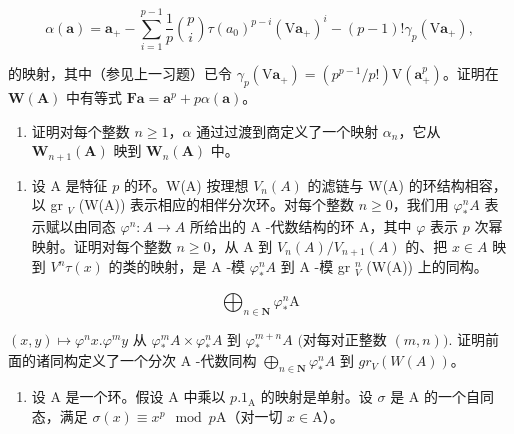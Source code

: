 \[
\alpha (\boldsymbol {a}) = \boldsymbol {a} _ {+} - \sum_ {i = 1} ^ {p - 1} \frac {1}{p} \binom {p} {i} \tau (a _ {0}) ^ {p - i} (\mathrm{V} \boldsymbol {a} _ {+}) ^ {i} - (p - 1)! \gamma_ {p} (\mathrm{V} \boldsymbol {a} _ {+}),
\]

的映射，其中（参见上一习题）已令 \(\gamma_{p}(\mathrm{V}\boldsymbol{a}_{+}) = (p^{p-1}/p!)\mathrm{V}(\boldsymbol{a}_{+}^{p})\)。证明在 \(\mathbf{W}(\mathbf{A})\) 中有等式 \(\mathbf{F}\boldsymbol{a} = \boldsymbol{a}^{p} + p\alpha(\boldsymbol{a})\)。

\begin{enumerate}
\def\labelenumi{\alph{enumi})}
\setcounter{enumi}{2}
\tightlist
\item
  证明对每个整数 \(n \geqslant 1\)，\(\alpha\) 通过过渡到商定义了一个映射 \(\alpha_{n}\)，它从 \(\mathbf{W}_{n+1}(\mathbf{A})\) 映到 \(\mathbf{W}_{n}(\mathbf{A})\) 中。
\end{enumerate}

\begin{enumerate}
\def\labelenumi{\arabic{enumi})}
\setcounter{enumi}{12}
\tightlist
\item
  设 A 是特征 \(p\) 的环。W(A) 按理想 \(V_n(A)\) 的滤链与 W(A) 的环结构相容，以 gr \(_{V}\) (W(A)) 表示相应的相伴分次环。对每个整数 \(n \geqslant 0\)，我们用 \(\varphi_*^n A\) 表示赋以由同态 \(\varphi^n: A \to A\) 所给出的 A -代数结构的环 A，其中 \(\varphi\) 表示 \(p\) 次幂映射。证明对每个整数 \(n \geqslant 0\)，从 A 到 \(V_n(A)/V_{n+1}(A)\) 的、把 \(x \in A\) 映到 \(V^n\tau(x)\) 的类的映射，是 A -模 \(\varphi_*^n A\) 到 A -模 gr \(_{V}^n\) (W(A)) 上的同构。
\end{enumerate}

\[
\bigoplus_ {n \in \mathbf {N}} \varphi_ {*} ^ {n} \mathrm{A}
\]

\((x, y) \mapsto \varphi^{n} x. \varphi^{m} y \text{ 从 } \varphi_{*}^{m} A \times \varphi_{*}^{n} A \text{ 到 } \varphi_{*}^{m+n} A \text{ (对每对正整数 } (m, n)).\) 证明前面的诸同构定义了一个分次 A -代数同构 \(\bigoplus_{n\in \mathbf{N}}\varphi_{*}^{n} A \text{ 到 } gr_{V}(W(A))\)。

\begin{enumerate}
\def\labelenumi{\arabic{enumi})}
\setcounter{enumi}{13}
\tightlist
\item
  设 A 是一个环。假设 A 中乘以 \(p.1_{\mathrm{A}}\) 的映射是单射。设 \(\sigma\) 是 A 的一个自同态，满足 \(\sigma(x) \equiv x^p \mod p\mathrm{A}\)（对一切 \(x \in \mathrm{A}\)）。
\end{enumerate}

